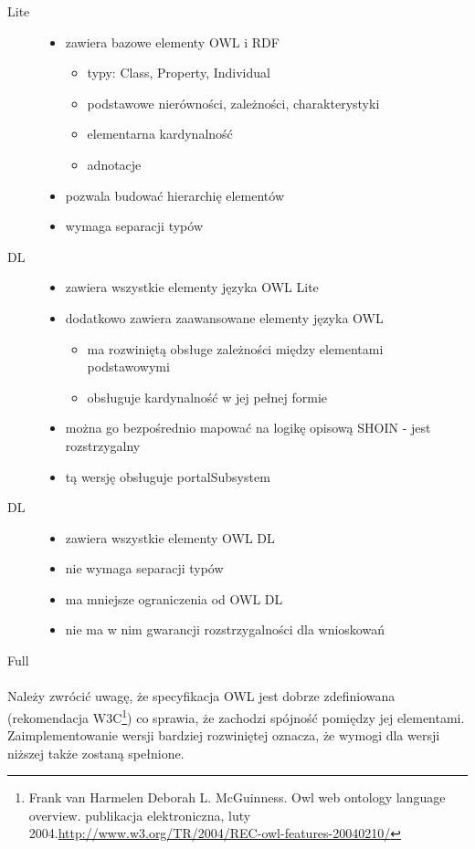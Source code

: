 \begin{description}
 \item[Lite]
 \begin{itemize}
	 \item zawiera bazowe elementy OWL i RDF
		\begin{itemize}
 		\item typy: Class, Property, Individual
		\item podstawowe nierówności, zależności, charakterystyki
		\item elementarna kardynalność
		\item adnotacje
		\end{itemize}
	\item pozwala budować hierarchię elementów
	\item wymaga separacji typów
	\end{itemize}
\item[DL]
\begin{itemize}
	\item zawiera wszystkie elementy języka OWL Lite
	\item dodatkowo zawiera zaawansowane elementy języka OWL
		\begin{itemize}
 		\item ma rozwiniętą obsługe zależności między elementami podstawowymi
		\item obsługuje kardynalność w jej pełnej formie
		\end{itemize}
	\item można go bezpośrednio mapować na logikę opisową SHOIN - jest rozstrzygalny
	\item tą wersję obsługuje portalSubsystem
	\end{itemize}
\item[DL]
\begin{itemize}
	\item zawiera wszystkie elementy OWL DL
	\item nie wymaga separacji typów
	\item ma mniejsze ograniczenia od OWL DL
	\item nie ma w nim gwarancji rozstrzygalności dla wnioskowań
	\end{itemize}
\item[Full]
 
\end{description}

\paragraph{} Należy zwrócić uwagę, że specyfikacja OWL jest dobrze zdefiniowana (rekomendacja W3C\footnote{Frank van Harmelen Deborah L. McGuinness. Owl web ontology language overview. publikacja elektroniczna, luty 2004.\url{http://www.w3.org/TR/2004/REC-owl-features-20040210/}
}) co sprawia, że zachodzi spójność pomiędzy jej elementami. Zaimplementowanie wersji bardziej rozwiniętej oznacza, że wymogi dla wersji niższej także zostaną spełnione.




